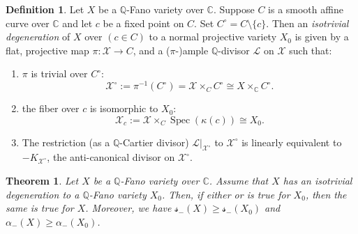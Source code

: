 \documentclass[11pt,reqno]{amsart}
\newcommand{\C}{\mathbb{C}}
\newcommand{\Q}{\mathbb{Q}}
\newcommand{\cL}{\mathcal{L}}
\newcommand{\cX}{\mathcal{X}}
\newcommand{\isom}{\cong}
\DeclareMathOperator{\Spec}{Spec}
\numberwithin{equation}{section}
\newtheorem{thm}[prop] {Theorem}
\theoremstyle{definition}
\newtheorem{defi}[prop] {Definition}
\newcommand{\s}{\mathscr{s}}
\begin{document}
\begin{defi} \label{isotrivialdfn}
    Let $X$ be a $\Q$-Fano variety over $\C$. Suppose $C$ is a smooth affine curve over $\C$ and let $c$ be a fixed point on $C$. Set $C^{\circ} =  C \setminus \{c\}$. Then an \emph{isotrivial degeneration} of $X$ over $(c \in C)$ to a normal projective variety $X_{0}$ is given by a flat, projective map $\pi: \cX \to C$, and a ($\pi$-)ample $\Q$-divisor $\cL$ on $\cX$ such that:
    
    \begin{enumerate}
        \item $\pi$ is trivial over $C^\circ$: 
        \[ \cX^{\circ} := \pi^{-1}(C^{\circ}) = \cX  \times_{C} C^{\circ} \isom X \times_{\C} C^{\circ} .\]
        \item the fiber over $c$ is isomorphic to $X_{0}$:
        \[ \cX_{c} := \cX \times_{C} \Spec(\kappa(c)) \isom X_0. \]
        \item The restriction (as a $\Q$-Cartier divisor) $\cL|_{\cX^{\circ}}$ to $\cX^{\circ}$ is linearly equivalent to $-K_{\cX^{\circ}}$, the anti-canonical divisor on $\cX^{\circ}$.
    \end{enumerate}  
\end{defi}

\begin{thm}\label{variationthm}
    Let $X$ be a $\Q$-Fano variety over $\C$. Assume that $X$ has an isotrivial degeneration to a $\Q$-Fano variety $X_{0}$. Then, if either  or  is true for $X_0$, then the same is true for $X$. Moreover, we have $\s_{-} (X) \geq \s_{-} (X_0)$
    and 
    $ \alpha_{-} (X) \geq \alpha_{-} (X_0) $.
\end{thm}
\end{document}
